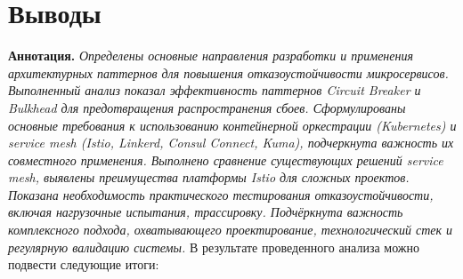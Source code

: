 \section{Выводы}
\textbf{Аннотация.} \textit{Определены основные направления разработки и применения архитектурных паттернов для повышения отказоустойчивости микросервисов. Выполненный анализ показал эффективность паттернов Circuit Breaker и Bulkhead для предотвращения распространения сбоев. Сформулированы основные требования к использованию контейнерной оркестрации (Kubernetes) и service mesh (Istio, Linkerd, Consul Connect, Kuma), подчеркнута важность их совместного применения. Выполнено сравнение существующих решений service mesh, выявлены преимущества платформы Istio для сложных проектов. Показана необходимость практического тестирования отказоустойчивости, включая нагрузочные испытания, трассировку. Подчёркнута важность комплексного подхода, охватывающего проектирование, технологический стек и регулярную валидацию системы.}
В результате проведенного анализа можно подвести следующие итоги:
